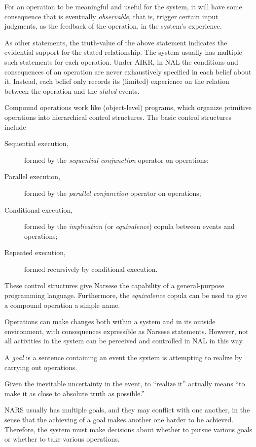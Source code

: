 For an operation to be meaningful and useful for the system, it will have some consequence that is eventually \emph{observable}, that is, trigger certain input judgments, as the feedback of the operation, in the system's experience.

As other statements, the truth-value of the above statement indicates the evidential support for the stated relationship. The system usually has multiple such statements for each operation. Under AIKR, in NAL the conditions and consequences of an operation are never exhaustively specified in each belief about it. Instead, each belief only records its (limited) experience on the relation between the operation and the \emph{stated} events. 

Compound operations work like (object-level) programs, which organize primitive operations into hierarchical control structures. The basic control structures include
\begin{description}
	\item[Sequential execution,] formed by the \emph{sequential conjunction} operator on operations;
	\item[Parallel execution,] formed by the \emph{parallel conjunction} operator on operations;
	\item[Conditional execution,] formed by the \emph{implication} (or \emph{equivalence}) copula between events and operations;
	\item[Repeated execution,] formed recursively by conditional execution.
\end{description}
These control structures give Narsese the capability of a general-purpose programming language. Furthermore, the \emph{equivalence} copula can be used to give a compound operation a simple name.

Operations can make changes both within a system and in its outside environment, with consequences expressible as Narsese statements. However, not all activities in the system can be perceived and controlled in NAL in this way.

\begin{defi}
A \emph{goal} is a sentence containing an event the system is attempting to realize by carrying out operations.
\end{defi}
Given the inevitable uncertainty in the event, to ``realize it'' actually means ``to make it as close to absolute truth as possible.'' 

NARS usually has multiple goals, and they may conflict with one another, in the sense that the achieving of a goal makes another one harder to be achieved. Therefore, the system must make decisions about whether to pursue various goals or whether to take various operations.

